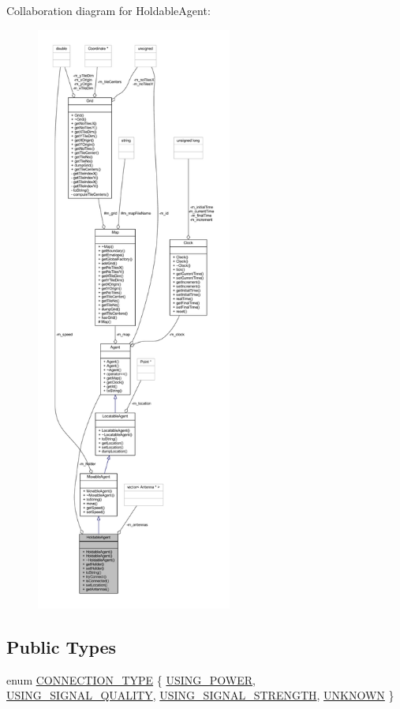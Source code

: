 Collaboration diagram for Holdable\+Agent\+:
\nopagebreak
\begin{figure}[H]
\begin{center}
\leavevmode
\includegraphics[height=550pt]{class_holdable_agent__coll__graph}
\end{center}
\end{figure}
\subsection*{Public Types}
\begin{DoxyCompactItemize}
\item 
enum \hyperlink{class_holdable_agent_ae2c334b004d7b9c5a999cf2618e4e518}{C\+O\+N\+N\+E\+C\+T\+I\+O\+N\+\_\+\+T\+Y\+PE} \{ \hyperlink{class_holdable_agent_ae2c334b004d7b9c5a999cf2618e4e518ab8f4a3956d88a54e0aad08e89e203fd6}{U\+S\+I\+N\+G\+\_\+\+P\+O\+W\+ER}, 
\hyperlink{class_holdable_agent_ae2c334b004d7b9c5a999cf2618e4e518a93c5b260edf949c65b96fec443c33f2b}{U\+S\+I\+N\+G\+\_\+\+S\+I\+G\+N\+A\+L\+\_\+\+Q\+U\+A\+L\+I\+TY}, 
\hyperlink{class_holdable_agent_ae2c334b004d7b9c5a999cf2618e4e518ac0a762a4e8fa38dd6285f84aefadd3f4}{U\+S\+I\+N\+G\+\_\+\+S\+I\+G\+N\+A\+L\+\_\+\+S\+T\+R\+E\+N\+G\+TH}, 
\hyperlink{class_holdable_agent_ae2c334b004d7b9c5a999cf2618e4e518a6bdb1529a2032a4648226328e179f552}{U\+N\+K\+N\+O\+WN}
 \}
\end{DoxyCompactItemize}
